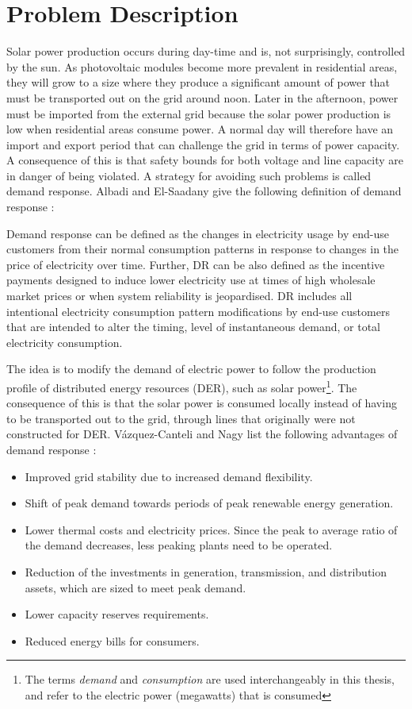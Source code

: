 \documentclass[class=book, crop=false]{standalone}
\begin{document}
\chapter{Problem Description}\label{chap:problem_description}
Solar power production occurs during day-time and is, not surprisingly, controlled by the sun. As photovoltaic modules become more prevalent in residential areas, they will grow to a size where they produce a significant amount of power that must be transported out on the grid around noon. Later in the afternoon, power must be imported from the external grid because the solar power production is low when residential areas consume power. A normal day will therefore have an import and export period that can challenge the grid in terms of power capacity. A consequence of this is that safety bounds for both voltage and line capacity are in danger of being violated. A strategy for avoiding such problems is called demand response. Albadi and El-Saadany give the following definition of demand response \cite{demand_response_definition}:

\begin{displayquote}
Demand response can be defined as the changes in electricity usage by end-use customers from their normal consumption patterns in response to changes in the price of electricity over time. Further, DR can be also defined as the incentive payments designed to induce lower electricity use at times of high wholesale market prices or when system reliability is jeopardised. DR includes all intentional electricity consumption pattern modifications by end-use customers that are intended to alter the timing, level of
instantaneous demand, or total electricity consumption.
\end{displayquote}


The idea is to modify the demand of electric power to follow the production profile of distributed energy resources (DER), such as solar power\footnote{The terms \textit{demand} and \textit{consumption} are used interchangeably in this thesis, and refer to the electric power (megawatts) that is consumed}. The consequence of this is that the solar power is consumed locally instead of having to be transported out to the grid, through lines that originally were not constructed for DER. Vázquez-Canteli and Nagy list the following advantages of demand response \cite{active_network_management}:

\begin{itemize}
\item Improved grid stability due to increased demand flexibility. 
\item Shift of peak demand towards periods of peak renewable energy
generation.
\item Lower thermal costs and electricity prices. Since the peak to average
ratio of the demand decreases, less peaking plants need to be operated. 
\item Reduction of the investments in generation, transmission, and distribution assets, which are sized to meet peak demand.
\item Lower capacity reserves requirements.
\item Reduced energy bills for consumers. 
\end{itemize}
\end{document}
